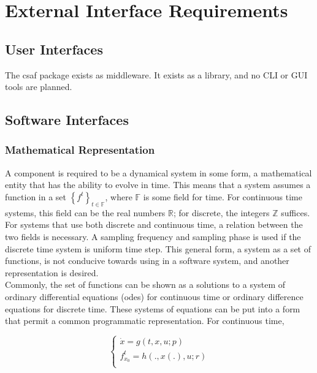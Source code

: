 \chapter{External Interface Requirements}

\section{User Interfaces}

The \acrshort{csaf}  package exists as middleware. It exists as a library, and no CLI or GUI tools are planned.

\section{Software Interfaces}

\subsection{Mathematical Representation}
A component is required to be a dynamical system in some form, a mathematical entity that has the ability to 
evolve in time. This means that a system assumes a function in a set $\left\{ f^t \right\}_{t \in \mathbb F}$, 
where $\mathbb F$ is some field for time. For continuous time systems, this field can be the real numbers $
\mathbb R$; for discrete, the integers $\mathbb Z$ suffices. For systems that use both discrete and 
continuous time, a relation between the two fields is necessary. A sampling frequency and sampling phase is 
used if the discrete time system is uniform time step. This general form, a system as a set of functions, is not 
conducive towards using in a software system, and another representation is desired. \\

Commonly, the set of functions can be shown as a solutions to a system of ordinary differential equations 
(\acrshort{ode}s) for continuous time or ordinary difference equations for discrete time. These systems of 
equations can be put into a form that permit a common programmatic representation. For continuous time,

\begin{equation}
\begin{cases}
\dot x = g(t, x, u; p) \\
f_{x_0}^t = h(., x(.), u; r) \\
\end{cases}
\end{equation}

